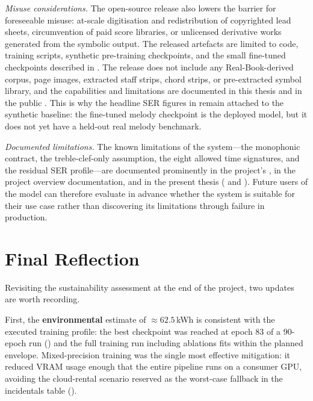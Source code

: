 \textit{Misuse considerations.}
The open-source release also lowers the barrier for foreseeable
misuse: at-scale digitisation and redistribution of copyrighted lead
sheets, circumvention of paid score libraries, or unlicensed
derivative works generated from the symbolic output.
The released artefacts are limited to code, training scripts, synthetic
pre-training checkpoints, and the small fine-tuned checkpoints described
in . The release does not include any
Real-Book-derived corpus, page images, extracted staff strips, chord
strips, or pre-extracted symbol library, and the capabilities and
limitations are documented in this thesis and in the public
. This is why the headline SER figures in
 remain attached to the synthetic baseline: the
fine-tuned melody checkpoint is the deployed model, but it does not yet
have a held-out real melody benchmark.

\textit{Documented limitations.}
The known limitations of the system---the monophonic contract,
the treble-clef-only assumption, the eight allowed time
signatures, and the residual SER profile---are documented
prominently in the project's , in the project
overview documentation, and in the present thesis
( and ).
Future users of the model can therefore evaluate in advance
whether the system is suitable for their use case rather than
discovering its limitations through failure in production.

\section{Final Reflection}
\label{sec:sust-final}

Revisiting the sustainability assessment at the end of the project,
two updates are worth recording.

First, the \textbf{environmental} estimate of $\approx 62.5$\,kWh
is consistent with the executed training profile: the best checkpoint
was reached at epoch \num{83} of a 90-epoch run ()
and the full training run including ablations fits within the planned
envelope.
Mixed-precision training was the single most effective mitigation:
it reduced VRAM usage enough that the entire pipeline runs on a
consumer GPU, avoiding the cloud-rental scenario reserved as the
worst-case fallback in the incidentals table
().

